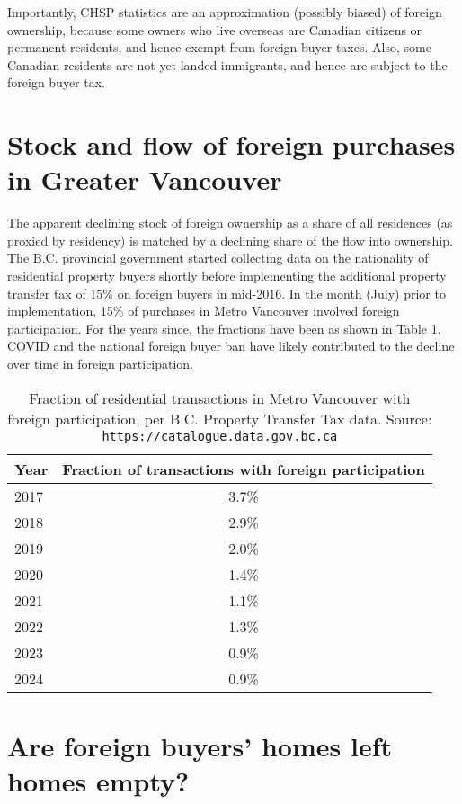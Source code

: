 \documentclass[12pt]{article}
\begin{document}
Importantly, CHSP statistics are an approximation (possibly biased) of foreign
ownership, because some owners who live overseas are Canadian citizens or
permanent residents, and hence exempt from foreign buyer taxes. Also, some
Canadian residents are not yet landed immigrants, and hence are subject to the
foreign buyer tax. 

\section{Stock and flow of foreign purchases in Greater Vancouver}

The apparent declining stock of foreign ownership as a share of all residences
(as proxied by residency) is matched by a declining share of the flow into
ownership. The B.C. provincial government started collecting data on the
nationality of residential property buyers shortly before implementing the
additional property transfer tax of 15\% on foreign buyers in mid-2016. In the
month (July) prior to implementation, 15\% of purchases in Metro Vancouver
involved foreign participation. For the years since, the fractions have been as
shown in Table \ref{tab:fbt}. COVID and the national foreign buyer ban have
likely contributed to the decline over time in foreign participation.

\begin{table}
	\caption{\label{tab:fbt} Fraction of residential transactions in Metro Vancouver with foreign participation, per B.C. Property Transfer Tax data. Source: \texttt{https://catalogue.data.gov.bc.ca}}
	\begin{tabular}{lc}
		\hline
		Year & Fraction of transactions with foreign participation \\
		\hline\hline
		2017 & 3.7\% \\
		2018 & 2.9\% \\
		2019 & 2.0\%\\
		2020 & 1.4\%\\
		2021 & 1.1\%\\
		2022 & 1.3\%\\
		2023 & 0.9\%\\
		2024 & 0.9\%\\
		\hline
	\end{tabular}
\end{table}

\section{Are foreign buyers' homes left homes empty?}
\end{document}
